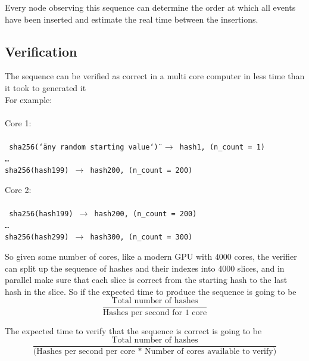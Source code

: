 \documentclass[12pt]{article}
\begin{document}
Every node observing this sequence can determine the order at which all events have been inserted and estimate the real time between the insertions.

\subsection{Verification}
The sequence can be verified as correct in a multi core computer in less time than it took to generated it \\

\noindent For example: \\\\\noindent
\noindent Core 1: \\\\\noindent
\texttt{
sha256(\char`\"any random starting value\char`\") $\rightarrow$ hash1, (n\_count = 1)\\
\ldots\\
sha256(hash199) $\rightarrow$ hash200, (n\_count = 200)\\
}

\noindent Core 2: \\\\\noindent
\texttt{
sha256(hash199) $\rightarrow$ hash200, (n\_count = 200)\\
\ldots\\
sha256(hash299) $\rightarrow$ hash300, (n\_count = 300)\\
}

So given some number of cores, like a modern GPU with $4000$ cores, the verifier can split up the sequence of hashes and their indexes into $4000$ slices, and in parallel make sure that each slice is correct from the starting hash to the last hash in the slice. So if the expected time to produce the sequence is going to be\\


\[
\frac{\textrm{Total number of hashes}}{\textrm{Hashes per second for 1 core}}
\]

\noindent The expected time to verify that the sequence is correct is going to be \\

\[
\frac{\textrm{Total number of hashes}}{\textrm{(Hashes per second per core * Number of cores available to verify)}}
\]
\end{document}
